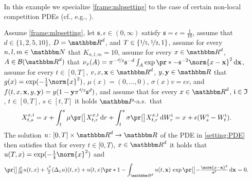 \begin{example}

	\label{exampleMLP:nonlocal_comp}
	In this example we specialize \cref{frame:mlpsetting} to the case of certain non-local competition PDEs (cf., e.g., \cite{Doebeli2010,Berestycki2009b,Perthame2007,Genieys2006a}).

	Assume 
		\cref{frame:mlpsetting},
	let
		$\mathfrak s,\epsilon\in(0,\infty)$
	satisfy 
		$\mathfrak{s} = \epsilon = \tfrac{1}{10}$,
	assume that
		$d\in\{1,2,5,10\}$,
		$D = \R^d$, and
		$T\in\{\nicefrac{1}{5},\nicefrac{1}{2},1\}$,
	assume for every 
		$n,l,m\in \N$ 
	that
		$K_{n,l,m} = 10$,
	assume for every
		$x \in \R^d$,
		$A \in \mathcal{B}(\R^d)$
	that
		$\nu_x(A) = \pi^{-\nicefrac{d}{2}}\mathfrak{s}^{-d}\int_A \exp\pr*{-\mathfrak{s}^{-2}\norm{x - \mathbf{x}}^2}\,\diff\mathbf{x}$,
	assume for every 
		$t \in [0,T]$,
		$v,x,\mathbf{x} \in \R^d$,
		$y,\mathbf{y} \in \R$
	that
		$g(x)= \exp (- \tfrac{1}{4}\norm{x}^2)$,
		$\mu(x)=(0,\dots,0)$,
		$\sigma(x) v = \epsilon v$, and
		$f(t,x,\mathbf{x},y,\mathbf{y})= y(1 -\mathbf{y}\pi^{\nicefrac{d}{2}}\mathfrak{s}^d)$,
	and	assume that for every 
		$x\in \R^{d}$, 
		$\mathfrak{i} \in \mathfrak{I}$, 
		$t\in [0,T]$, 
		$s\in [t,T]$ 
	it holds $\P$-a.s.\ that
	\begin{equation}
		X^{x,\dindex}_{t,s} 
		= 
		x + \int_{t}^{s} \mu\bpr{X^{x,\dindex}_{t,r}} \, \diff r + \int^{s}_{t} \sigma \bpr{X^{x,\dindex}_{t,r}} \, \diff W^{\dindex}_{r}
		=
		x+\epsilon(W^\dindex_s-W^\dindex_t)
		.
	\end{equation}
	The solution 
		$u\colon[0,T]\times \R^d \to \R$ 
		of the PDE in \eqref{setting:PDE} then satisfies that
	for every
		$t\in [0,T)$, 
		$x\in\R^d$
	it holds that
		$u(T,x) = \exp (-\tfrac{1}{4}\norm{x}^2)$ and
		\begin{equation}
			\label{eqMLP:nonlocalcompet}
			\bpr{\tfrac{\partial }{\partial t}u} (t,x) 
			+
			\tfrac{\epsilon^2}{2}(\Delta_x u) (t,x) 
			+ 
			u(t,x)\pr*{1 - \int_{\R^d} u(t,\mathbf{x})\,\exp\bpr{-\tfrac{\norm{x-\mathbf{x}}^2}{\mathfrak{s}^2}} \, \diff\mathbf{x} }
			=
			0
			.
	\end{equation}
\end{example}

